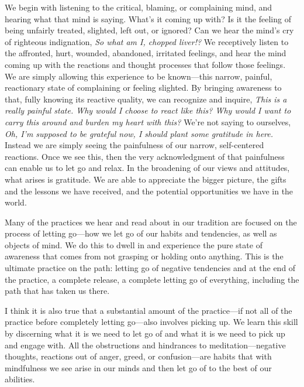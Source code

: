 We begin with listening to the critical, blaming, or complaining mind, 
and hearing what that mind is saying. What's it coming up with? Is it 
the feeling of being unfairly treated, slighted, left out, or ignored? 
Can we hear the mind's cry of righteous indignation, \emph{So what am 
I, chopped liver!?} We receptively listen to the affronted, hurt, 
wounded, abandoned, irritated feelings, and hear the mind coming up 
with the reactions and thought processes that follow those feelings. We 
are simply allowing this experience to be known---this narrow, painful, 
reactionary state of complaining or feeling slighted. By bringing 
awareness to that, fully knowing its reactive quality, we can recognize 
and inquire, \emph{This is a really painful state. Why would I choose 
to react like this? Why would I want to carry this around and burden my 
heart with this?} We're not saying to ourselves, \emph{Oh, I'm supposed 
to be grateful now, I should plant some gratitude in here.} Instead we 
are simply seeing the painfulness of our narrow, self-centered 
reactions. Once we see this, then the very acknowledgment of that 
painfulness can enable us to let go and relax. In the broadening of our 
views and attitudes, what arises is gratitude. We are able to 
appreciate the bigger picture, the gifts and the lessons we have 
received, and the potential opportunities we have in the world.


Many of the practices we hear and read about in our tradition are 
focused on the process of letting go---how we let go of our habits and 
tendencies, as well as objects of mind. We do this to dwell in and 
experience the pure state of awareness that comes from not grasping or 
holding onto anything. This is the ultimate practice on the path: 
letting go of negative tendencies and at the end of the practice, a 
complete release, a complete letting go of everything, including the 
path that has taken us there.

I think it is also true that a substantial amount of the practice---if 
not all of the practice before completely letting go---also involves 
picking up. We learn this skill by discerning what it is we need to let 
go of and what it is we need to pick up and engage with. All the 
obstructions and hindrances to meditation---negative thoughts, 
reactions out of anger, greed, or confusion---are habits that with 
mindfulness we see arise in our minds and then let go of to the best of 
our abilities.

